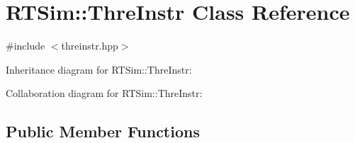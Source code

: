 \hypertarget{classRTSim_1_1ThreInstr}{}\section{R\+T\+Sim\+:\+:Thre\+Instr Class Reference}
\label{classRTSim_1_1ThreInstr}


{\ttfamily \#include $<$threinstr.\+hpp$>$}



Inheritance diagram for R\+T\+Sim\+:\+:Thre\+Instr\+:


Collaboration diagram for R\+T\+Sim\+:\+:Thre\+Instr\+:
\subsection*{Public Member Functions}
